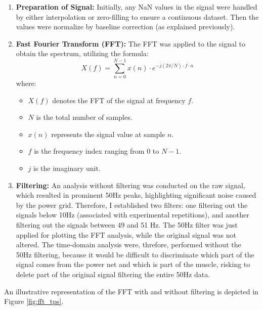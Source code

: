 \documentclass[conference]{IEEEtran}
\begin{document}
\begin{enumerate}
    \item \textbf{Preparation of Signal:} Initially, any NaN values in the signal were 
    handled by either interpolation or zero-filling to ensure a continuous dataset. Then the values were normalize by baseline correction (as explained previously).
    
    \item \textbf{Fast Fourier Transform (FFT):} The FFT was applied to the signal to 
    obtain the spectrum, utilizing the formula:
    \[
    X(f) = \sum_{n=0}^{N-1} x(n) \cdot e^{-j(2\pi/N) \cdot f \cdot n}
    \]
    where:
    \begin{itemize}
        \item \( X(f) \) denotes the FFT of the signal at frequency \( f \).
        \item \( N \) is the total number of samples.
        \item \( x(n) \) represents the signal value at sample \( n \).
        \item \( f \) is the frequency index ranging from 0 to \( N-1 \).
        \item \( j \) is the imaginary unit.
    \end{itemize}
    
    \item \textbf{Filtering:} An analysis without filtering was conducted on the raw signal,
    which resulted in prominent 50Hz peaks, highlighting significant noise caused by the power grid.
    Therefore, I established two filters: one filtering out the signals below 10Hz (associated with
    experimental repetitions), and another filtering out the signals between 49 and 51 Hz. The 50Hz filter was just 
    applied for plotting the FFT analysis, while the original signal was not altered. The time-domain analysis were, threfore,
    performed without the 50Hz filtering, because it would be difficult to discriminate which part of the signal comes from the power net and which is part of 
    the muscle, risking to delete part of the original signal filtering the entire 50Hz data.

    
\end{enumerate}

An illustrative representation of the FFT with and without filtering is depicted in Figure 
\ref{fig:fft_tps}.
\end{document}
